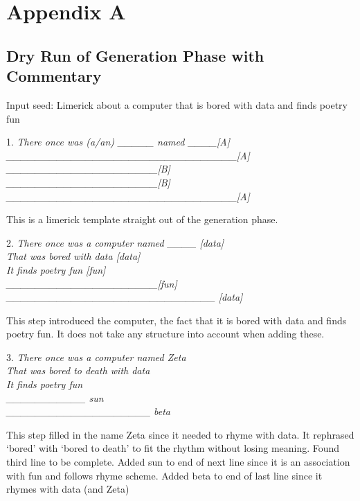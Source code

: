 \chapter{Appendix A}

\section{Dry Run of Generation Phase with Commentary}

Input seed: Limerick about a computer that is bored with data and finds poetry fun

1. 
\textit{There once was (a/an) \_\_\_\_\_ named \_\_\_\_[A]\\
\_\_\_\_\_\_\_\_\_\_\_\_\_\_\_\_\_\_\_\_\_\_\_\_\_\_\_\_\_\_\_\_[A]\\
\_\_\_\_\_\_\_\_\_\_\_\_\_\_\_\_\_\_\_\_\_[B]\\
\_\_\_\_\_\_\_\_\_\_\_\_\_\_\_\_\_\_\_\_\_[B]\\
\_\_\_\_\_\_\_\_\_\_\_\_\_\_\_\_\_\_\_\_\_\_\_\_\_\_\_\_\_\_\_\_[A]}

This is a limerick template straight out of the generation phase.

2.
\textit{There once was a computer named \_\_\_\_ [data]\\
That was bored with data [data]\\
It finds poetry fun [fun]\\
\_\_\_\_\_\_\_\_\_\_\_\_\_\_\_\_\_\_\_\_\_[fun]\\
\_\_\_\_\_\_\_\_\_\_\_\_\_\_\_\_\_\_\_\_\_\_\_\_\_\_\_\_\_ [data]}

This step introduced the computer, the fact that it is bored with data and finds poetry fun. It does not take any structure into account when adding these.

3.
\textit{There once was a computer named Zeta\\
That was bored to death with data\\
It finds poetry fun\\
\_\_\_\_\_\_\_\_\_\_\_ sun\\
\_\_\_\_\_\_\_\_\_\_\_\_\_\_\_\_\_\_\_\_ beta}

This step filled in the name Zeta since it needed to rhyme with data. 
It rephrased ‘bored’ with ‘bored to death’ to fit the rhythm without losing meaning. 
Found third line to be complete.
Added sun to end of next line since it is an association with fun and follows rhyme scheme.
Added beta to end of last line since it rhymes with data (and Zeta)

